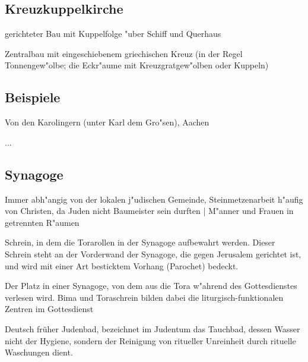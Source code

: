 \documentclass[emulatestandardclasses]{scrartcl}
\begin{document}
\subsection{Kreuzkuppelkirche}

\begin{description}[leftmargin=!,labelwidth=\widthof{\bfseries Variante 2}]
  \item[Variante 1] gerichteter Bau mit Kuppelfolge "uber Schiff und Querhaus
  \item[Variante 2] Zentralbau mit eingeschiebenem griechischen Kreuz (in der Regel Tonnengew"olbe; die Eckr"aume mit Kreuzgratgew"olben oder Kuppeln)  
\end{description}

\subsection{Beispiele}

\begin{description}[leftmargin=!,labelwidth=\widthof{\bfseries Kath. Dom St. Marien}]
  \item[Kath. Dom St. Marien] Von den Karolingern (unter Karl dem Gro"sen), Aachen
  \item[St. Galler Klosterplan] ...  
\end{description}

\subsection{Synagoge}

\begin{description}[leftmargin=!,labelwidth=\widthof{\bfseries Thoraschrein}]
  \item[Allgemeines] Immer abh"angig von der lokalen j"udischen Gemeinde, Steinmetzenarbeit h"aufig von Christen, da Juden nicht Baumeister sein durften | M"anner und Frauen in getrennten R"aumen
  \item[Thoraschrein] Schrein, in dem die Torarollen in der Synagoge aufbewahrt werden. Dieser Schrein steht an der Vorderwand der Synagoge, die gegen Jerusalem gerichtet ist, und wird mit einer Art besticktem Vorhang (Parochet) bedeckt.
  \item[Bimah] Der Platz in einer Synagoge, von dem aus die Tora w"ahrend des Gottesdienstes verlesen wird. Bima und Toraschrein bilden dabei die liturgisch-funktionalen Zentren im Gottesdienst
  \item[Mikwe] Deutsch früher Judenbad, bezeichnet im Judentum das Tauchbad, dessen Wasser nicht der Hygiene, sondern der Reinigung von ritueller Unreinheit durch rituelle Waschungen dient.
\end{description}
\end{document}
